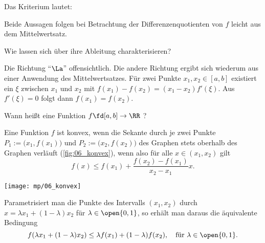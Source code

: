 \begin{antwort}
Das Kriterium lautet: 

\medskip\noindent{}
\noindent
Beide Aussagen folgen bei Betrachtung der 
Differenzenquotienten von $f$ leicht aus dem Mittelwertsatz. 
\AntEnd
\end{antwort}

\begin{frage}\label{06_konst}
Wie lassen sich  über ihre Ableitung 
charakterisieren?
\end{frage}

\begin{antwort}

\medskip\noindent
Die Richtung "`$\La$"' offensichtlich. Die andere Richtung 
ergibt sich wiederum aus einer Anwendung des Mittelwertsatzes. 
Für zwei Punkte $x_1,x_2 \in [a,b]$ existiert ein $\xi$ 
zwischen $x_1$ und $x_2$ mit 
$f(x_1)-f(x_2)=(x_1-x_2)f'(\xi)$. Aus $f'(\xi)=0$ folgt dann 
$f(x_1)=f(x_2)$.
\AntEnd
\end{antwort}

\begin{frage}\label{06_konvex}
Wann heißt eine Funktion $f\fd [a,b] \to \RR$ ?
\end{frage}

\begin{antwort}
Eine Funktion $f$ ist konvex, wenn die 
Sekante durch je zwei Punkte 
$P_1:=\big(x_1,f(x_1)\big)$ und $P_2:=\big(x_2,f(x_2)\big)$ 
des Graphen stets oberhalb des Graphen verläuft 
(\sieheAbbildung\ref{fig:06_konvex}), wenn also für alle 
$x\in (x_1,x_2)$ gilt
\[
f(x) \le f(x_1)+\frac{f(x_2)-f(x_1)}{x_2-x_1}  x. 
\]

\begin{center}
  \texttt{[image: mp/06\_konvex]}
  \label{fig:06_konvex}
\end{center}

Parametrisiert man die Punkte des Intervalls $(x_1,x_2)$ durch  
$x=\lambda x_1 + (1-\lambda) x_2$ für 
$\lambda \in \open{0,1}$, so erhält man 
daraus die äquivalente Bedingung 
\[
f(  \lambda x_1 + (1-\lambda) x_2 ) \le 
\lambda f(x_1) + (1-\lambda) f(x_2), 
\quad\text{für $\lambda \in\open{0,1}$}. 
\]
\end{antwort}

